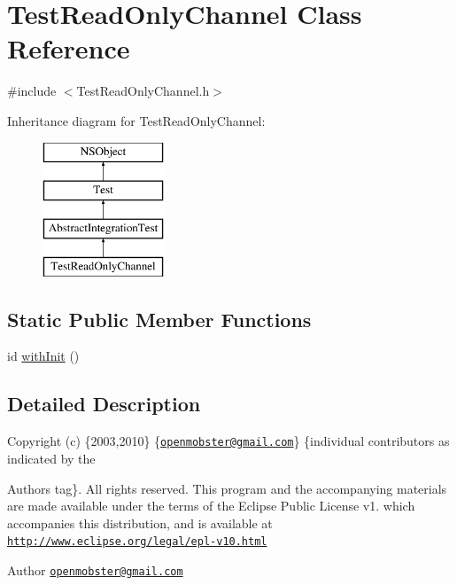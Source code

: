 \hypertarget{interface_test_read_only_channel}{
\section{\-Test\-Read\-Only\-Channel \-Class \-Reference}
\label{interface_test_read_only_channel}
}


{\ttfamily \#include $<$\-Test\-Read\-Only\-Channel.\-h$>$}

\-Inheritance diagram for \-Test\-Read\-Only\-Channel\-:\begin{figure}[H]
\begin{center}
\leavevmode
\includegraphics[height=4.000000cm]{interface_test_read_only_channel}
\end{center}
\end{figure}
\subsection*{\-Static \-Public \-Member \-Functions}
\begin{DoxyCompactItemize}
\item 
id \hyperlink{interface_test_read_only_channel_a79b0f5a8749f09be864813b96cc77562}{with\-Init} ()
\end{DoxyCompactItemize}


\subsection{\-Detailed \-Description}
\-Copyright (c) \{2003,2010\} \{\href{mailto:openmobster@gmail.com}{\tt openmobster@gmail.\-com}\} \{individual contributors as indicated by the \begin{DoxyAuthor}{\-Authors}
tag\}. \-All rights reserved. \-This program and the accompanying materials are made available under the terms of the \-Eclipse \-Public \-License v1. which accompanies this distribution, and is available at \href{http://www.eclipse.org/legal/epl-v10.html}{\tt http\-://www.\-eclipse.\-org/legal/epl-\/v10.\-html}
\end{DoxyAuthor}
\begin{DoxyAuthor}{\-Author}
\href{mailto:openmobster@gmail.com}{\tt openmobster@gmail.\-com} 
\end{DoxyAuthor}


